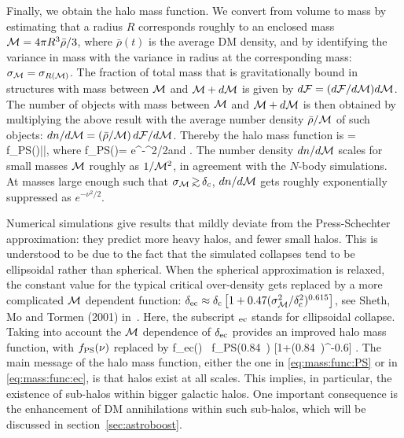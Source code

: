 \smallskip

Finally, we obtain the halo mass function. We convert from volume to mass by estimating that a radius $R$ corresponds roughly to an enclosed mass ${\mathcal{M}}  =4\pi R^3 \bar\rho/3$, where $\bar\rho(t)$ is the average DM density, and by identifying the variance in mass with the variance in radius at the corresponding mass: $\sigma_{\mathcal{M}}  = \sigma_{R({\mathcal{M}} )}$. 
The fraction of total mass that is gravitationally bound in structures with mass between ${\mathcal{M}} $ and ${\mathcal{M}} +d{\mathcal{M}}$ is given by
$d\mathcal{F} = (d\mathcal{F}/d{\mathcal{M}}) d{\mathcal{M}}$.
The number of objects with mass between ${\mathcal{M}} $ and ${\mathcal{M}} +d{\mathcal{M}}$ is then obtained by multiplying the above result with the average number 
density $\bar\rho/{\mathcal{M}} $ of such objects: $dn/d{\mathcal{M}} = (\bar\rho/{\mathcal{M}})\, d\mathcal{F}/d{\mathcal{M}} $.
Thereby the halo mass function is
\beq 
\label{eq:mass:func:PS}
  =  f_{\rm PS}(\nu)\left|\right|,
\qquad\hbox{where}\qquad
f_{\rm PS}(\nu)= \nu e^{-\nu^2/2}\qquad\hbox{and}\qquad
\nu\equiv {}.
\eeq
The number density $dn/d{\mathcal{M}} $  scales  for small masses ${\mathcal{M}} $ roughly as $1/{\mathcal{M}} ^2$,
in agreement with the $N$-body simulations.
At masses large enough such that $\sigma_\Mcal  \circa{>}\delta_c$,
$dn/d{\mathcal{M}} $ gets roughly exponentially suppressed as $e^{-\nu^2/2}$.


\smallskip

Numerical simulations give results that mildly deviate from the Press-Schechter approximation: they predict
more heavy halos, and fewer small halos.
This is understood to be due to the fact that the simulated
collapses tend to be ellipsoidal rather than spherical.
When the spherical approximation is relaxed, the constant value for the typical critical over-density 
gets replaced by a more complicated ${\mathcal{M}} $ dependent function:
$\delta_{\rm ec} \approx \delta_{\rm c} \left[ 1+ 0.47 (\sigma^2_{\mathcal{M}} /\delta_{\rm c}^2)^{0.615}\right]$,
see Sheth, Mo and Tormen (2001) in~\cite{HaloMassFunction}. Here, the subscript $_{\rm ec}$ stands for $e$llipsoidal $c$ollapse. 
Taking into account the ${\mathcal{M}}$ dependence of $\delta_{\rm ec}$ provides an improved halo mass function, with $f_{\rm PS}(\nu)$ replaced by
\beq 
\label{eq:mass:func:ec}
f_{\rm ec}(\nu)  \, f_{\rm PS}(0.84\, \nu) [1+(0.84\, \nu)^{-0.6}] .
\eeq
The main message of the halo mass function, either the one in \eqref{eq:mass:func:PS} or in \eqref{eq:mass:func:ec}, is that halos exist at all scales. This implies, in particular, the existence of sub-halos within bigger galactic halos. One important consequence is the enhancement of DM annihilations within such sub-halos, which will be discussed in section~\ref{sec:astroboost}.


